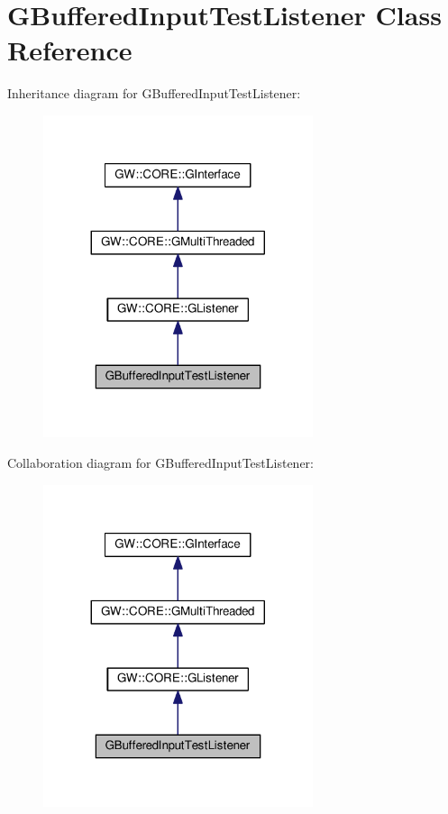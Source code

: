 \hypertarget{classGBufferedInputTestListener}{}\section{G\+Buffered\+Input\+Test\+Listener Class Reference}
\label{classGBufferedInputTestListener}


Inheritance diagram for G\+Buffered\+Input\+Test\+Listener\+:
\nopagebreak
\begin{figure}[H]
\begin{center}
\leavevmode
\includegraphics[width=224pt]{classGBufferedInputTestListener__inherit__graph}
\end{center}
\end{figure}


Collaboration diagram for G\+Buffered\+Input\+Test\+Listener\+:
\nopagebreak
\begin{figure}[H]
\begin{center}
\leavevmode
\includegraphics[width=224pt]{classGBufferedInputTestListener__coll__graph}
\end{center}
\end{figure}
